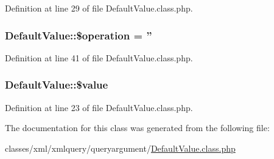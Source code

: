 Definition at line 29 of file Default\-Value.\-class.\-php.

\hypertarget{classDefaultValue_a0b0e52103637bbb5ea0fdedcb0672fcd}{
\subsubsection[{\$operation}]{\setlength{\rightskip}{0pt plus 5cm}Default\-Value\-::\$operation = ''}}\label{classDefaultValue_a0b0e52103637bbb5ea0fdedcb0672fcd}


Definition at line 41 of file Default\-Value.\-class.\-php.

\hypertarget{classDefaultValue_a963ea764e6dfb5dbfe87c4b8ffd131ac}{
\subsubsection[{\$value}]{\setlength{\rightskip}{0pt plus 5cm}Default\-Value\-::\$value}}\label{classDefaultValue_a963ea764e6dfb5dbfe87c4b8ffd131ac}


Definition at line 23 of file Default\-Value.\-class.\-php.



The documentation for this class was generated from the following file\-:\begin{DoxyCompactItemize}
\item 
classes/xml/xmlquery/queryargument/\hyperlink{DefaultValue_8class_8php}{Default\-Value.\-class.\-php}\end{DoxyCompactItemize}
